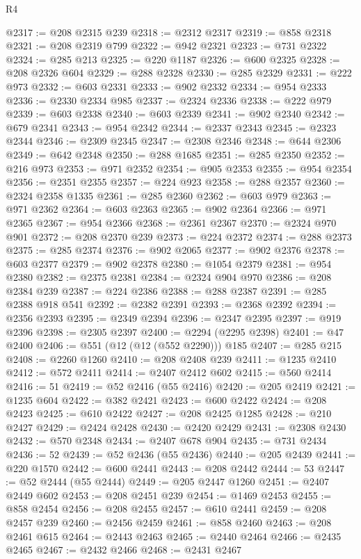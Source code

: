 \begin{lexlean}{R4}
\begin{coremodule}
@2317 := @208 @2315 @239
@2318 := @2312 @2317
@2319 := @858 @2318
@2321 := @208 @2319 @799
@2322 := @942 @2321
@2323 := @731 @2322
@2324 := @285 @213
@2325 := @220 @1187
@2326 := @600 @2325
@2328 := @208 @2326 @604
@2329 := @288 @2328
@2330 := @285 @2329
@2331 := @222 @973
@2332 := @603 @2331
@2333 := @902 @2332
@2334 := @954 @2333
@2336 := @2330 @2334 @985
@2337 := @2324 @2336
@2338 := @222 @979
@2339 := @603 @2338
@2340 := @603 @2339
@2341 := @902 @2340
@2342 := @679 @2341
@2343 := @954 @2342
@2344 := @2337 @2343
@2345 := @2323 @2344
@2346 := @2309 @2345
@2347 := @2308 @2346
@2348 := @644 @2306
@2349 := @642 @2348
@2350 := @288 @1685
@2351 := @285 @2350
@2352 := @216 @973
@2353 := @971 @2352
@2354 := @905 @2353
@2355 := @954 @2354
@2356 := @2351 @2355
@2357 := @224 @923
@2358 := @288 @2357
@2360 := @2324 @2358 @1335
@2361 := @285 @2360
@2362 := @603 @979
@2363 := @971 @2362
@2364 := @603 @2363
@2365 := @902 @2364
@2366 := @971 @2365
@2367 := @954 @2366
@2368 := @2361 @2367
@2370 := @2324 @970 @901
@2372 := @208 @2370 @239
@2373 := @224 @2372
@2374 := @288 @2373
@2375 := @285 @2374
@2376 := @902 @2065
@2377 := @902 @2376
@2378 := @603 @2377
@2379 := @902 @2378
@2380 := @1054 @2379
@2381 := @954 @2380
@2382 := @2375 @2381
@2384 := @2324 @904 @970
@2386 := @208 @2384 @239
@2387 := @224 @2386
@2388 := @288 @2387
@2391 := @285 @2388 @918 @541
@2392 := @2382 @2391
@2393 := @2368 @2392
@2394 := @2356 @2393
@2395 := @2349 @2394
@2396 := @2347 @2395
@2397 := @919 @2396
@2398 := @2305 @2397
@2400 := @2294 (@2295 @2398)
@2401 := @47 @2400
@2406 := @551 (@12 (@12 (@552 @2290))) @185
@2407 := @285 @215
@2408 := @2260 @1260
@2410 := @208 @2408 @239
@2411 := @1235 @2410
@2412 := @572 @2411
@2414 := @2407 @2412 @602
@2415 := @560 @2414
@2416 := 51
@2419 := @52 @2416 (@55 @2416)
@2420 := @205 @2419
@2421 := @1235 @604
@2422 := @382 @2421
@2423 := @600 @2422
@2424 := @208 @2423
@2425 := @610 @2422
@2427 := @208 @2425 @1285
@2428 := @210 @2427
@2429 := @2424 @2428
@2430 := @2420 @2429
@2431 := @2308 @2430
@2432 := @570 @2348
@2434 := @2407 @678 @904
@2435 := @731 @2434
@2436 := 52
@2439 := @52 @2436 (@55 @2436)
@2440 := @205 @2439
@2441 := @220 @1570
@2442 := @600 @2441
@2443 := @208 @2442
@2444 := 53
@2447 := @52 @2444 (@55 @2444)
@2449 := @205 @2447 @1260
@2451 := @2407 @2449 @602
@2453 := @208 @2451 @239
@2454 := @1469 @2453
@2455 := @858 @2454
@2456 := @208 @2455
@2457 := @610 @2441
@2459 := @208 @2457 @239
@2460 := @2456 @2459
@2461 := @858 @2460
@2463 := @208 @2461 @615
@2464 := @2443 @2463
@2465 := @2440 @2464
@2466 := @2435 @2465
@2467 := @2432 @2466
@2468 := @2431 @2467

\end{coremodule}
\end{lexlean}
